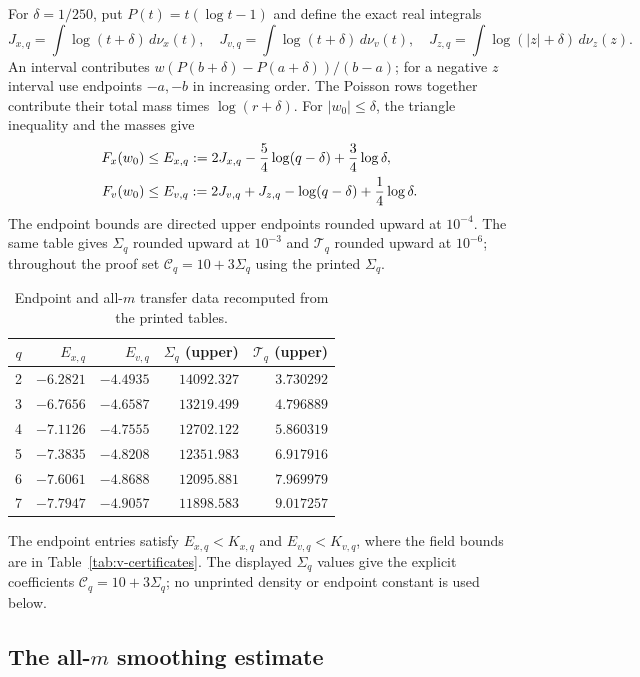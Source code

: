 For $\delta=1/250$, put $P(t)=t(\log t-1)$ and define the exact real
integrals
\[
 J_{x,q}=\int\log(t+\delta)\,d\nu_x(t),\quad
 J_{v,q}=\int\log(t+\delta)\,d\nu_v(t),\quad
 J_{z,q}=\int\log(|z|+\delta)\,d\nu_z(z).
\]
An interval contributes $w(P(b+\delta)-P(a+\delta))/(b-a)$; for a
negative $z$ interval use endpoints $-a,-b$ in increasing order.  The
Poisson rows together contribute their total mass times $\log(r+\delta)$.
For $|w_0|\le\delta$, the triangle inequality and the masses give
\begin{align}
 F_x(w_0)&\le E_{x,q}:=2J_{x,q}-\frac54\log(q-\delta)
                      +\frac34\log\delta,\notag\\
 F_v(w_0)&\le E_{v,q}:=2J_{v,q}+J_{z,q}-\log(q-\delta)
                      +\frac14\log\delta.\label{eq:v-endpoint}
\end{align}
The endpoint bounds are directed upper endpoints rounded upward at
$10^{-4}$.  The same table gives $\Sigma_q$ rounded upward at $10^{-3}$ and
$\mathcal T_q$ rounded upward at $10^{-6}$; throughout the proof set
$\mathcal C_q=10+3\Sigma_q$ using the printed $\Sigma_q$.
\begin{table}[ht]
\centering\normalsize
\renewcommand{\arraystretch}{1.12}
\caption{Endpoint and all-$m$ transfer data recomputed from the printed tables.}
\label{tab:v-transfer-constants}
\begin{tabular}{@{}crrrr@{}}
\hline
$q$&$E_{x,q}$&$E_{v,q}$&$\Sigma_q$ (upper)&$\mathcal T_q$ (upper)\\
\hline
2&$-6.2821$&$-4.4935$&$14092.327$&$3.730292$\\
3&$-6.7656$&$-4.6587$&$13219.499$&$4.796889$\\
4&$-7.1126$&$-4.7555$&$12702.122$&$5.860319$\\
5&$-7.3835$&$-4.8208$&$12351.983$&$6.917916$\\
6&$-7.6061$&$-4.8688$&$12095.881$&$7.969979$\\
7&$-7.7947$&$-4.9057$&$11898.583$&$9.017257$\\
\hline
\end{tabular}
\end{table}

The endpoint entries satisfy $E_{x,q}<K_{x,q}$ and $E_{v,q}<K_{v,q}$,
where the field bounds are in Table~\ref{tab:v-certificates}.  The displayed
$\Sigma_q$ values
give the explicit coefficients $\mathcal C_q=10+3\Sigma_q$; no unprinted density or
endpoint constant is used below.

\subsection{The all-$m$ smoothing estimate}
\label{subsec:v-allm-proof}

